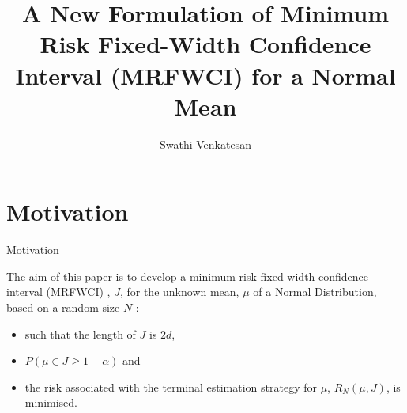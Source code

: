 \documentclass [xcolor=svgnames, t] {beamer}
\title[]{A New Formulation of Minimum Risk Fixed-Width Confidence
Interval (MRFWCI) for a Normal Mean}
\institute[]{Department of Statistics \\ University of Connecticut}
\author[]{ Swathi Venkatesan }
\date{}
\begin{document}
\begin{frame}
\maketitle
\end{frame}






\section{Motivation}
\begin{frame}{Motivation}
  \vspace{5mm}

The aim of this paper is to develop a minimum risk fixed-width confidence interval
(MRFWCI) , $J$, for the unknown mean, $\mu$ of a 
Normal Distribution, based on a random size $N$  :
\begin{itemize}
\item such that the length of $J$ is $2d$,
\item $P(\mu \in J \geq 1-\alpha)$ and
\item the risk associated with the terminal estimation strategy for $\mu$, $R_N(\mu,J)$, is minimised.
\end{itemize}

\end{frame}
\end{document}
